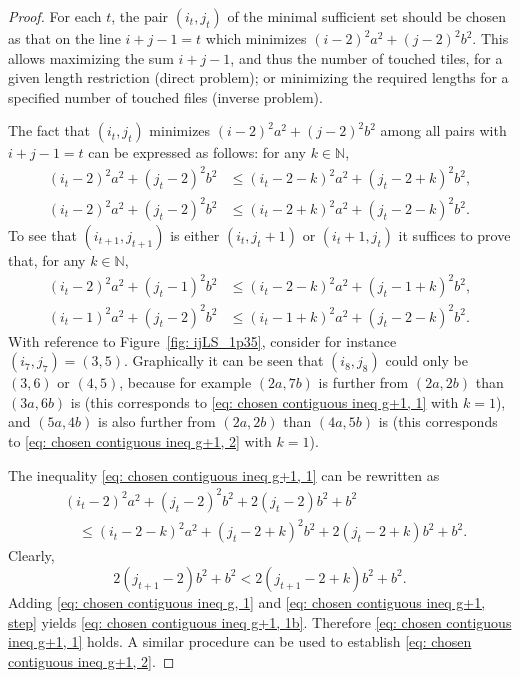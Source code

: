 \documentclass[12pt, a4paper]{article}
\newcommand{\tiles}{t} %
\begin{document}
\begin{proof}
For each $\tiles$, the pair $(i_\tiles,j_\tiles)$ of the minimal sufficient set should be chosen as that on the line $i+j-1=\tiles$ which minimizes $(i-2)^2 a^2 + (j-2)^2 b^2$. This allows maximizing the sum $i+j-1$, and thus the number of touched tiles, for a given length restriction (direct problem); or minimizing the required lengths for a specified number of touched files (inverse problem).

The fact that $(i_t,j_t)$ minimizes $(i-2)^2 a^2 + (j-2)^2 b^2$ among all pairs with $i+j-1=\tiles$ can be expressed as follows: for any $k \in \mathbb N$,
\begin{align}
\label{eq: chosen contiguous ineq g, 1}
(i_\tiles-2)^2 a^2 + (j_\tiles-2)^2 b^2 &\leq (i_\tiles-2-k)^2 a^2 + (j_\tiles-2+k)^2 b^2, \\
\label{eq: chosen contiguous ineq g, 2}
(i_\tiles-2)^2 a^2 + (j_\tiles-2)^2 b^2 &\leq (i_\tiles-2+k)^2 a^2 + (j_\tiles-2-k)^2 b^2.
\end{align}
To see that $(i_{\tiles+1},j_{\tiles+1})$ is either $(i_\tiles,j_\tiles+1)$ or $(i_\tiles+1,j_\tiles)$ it suffices to prove that, for any $k \in \mathbb N$,
\begin{align}
\label{eq: chosen contiguous ineq g+1, 1}
(i_{\tiles}-2)^2 a^2 + (j_{\tiles}-1)^2 b^2 &\leq (i_{\tiles}-2-k)^2 a^2 + (j_{\tiles}-1+k)^2 b^2, \\
\label{eq: chosen contiguous ineq g+1, 2}
(i_{\tiles}-1)^2 a^2 + (j_{\tiles}-2)^2 b^2 &\leq (i_{\tiles}-1+k)^2 a^2 + (j_{\tiles}-2-k)^2 b^2.
\end{align}
With reference to Figure~\ref{fig: ijLS_1p35}, consider for instance $(i_7,j_7) = (3,5)$. Graphically it can be seen that $(i_8,j_8)$ could only be $(3,6)$ or $(4,5)$, because for example $(2a,7b)$ is further from $(2a,2b)$ than $(3a,6b)$ is (this corresponds to \eqref{eq: chosen contiguous ineq g+1, 1} with $k=1$), and $(5a,4b)$ is also further from $(2a,2b)$ than $(4a,5b)$ is (this corresponds to \eqref{eq: chosen contiguous ineq g+1, 2} with $k=1$).

The inequality \eqref{eq: chosen contiguous ineq g+1, 1} can be rewritten as
\begin{equation}
\label{eq: chosen contiguous ineq g+1, 1b}
\begin{split}
& (i_{\tiles}-2)^2 a^2 + (j_{\tiles}-2)^2 b^2 + 2(j_{\tiles}-2)b^2 + b^2 \\
& \quad \leq (i_{\tiles}-2-k)^2 a^2 + (j_{\tiles}-2+k)^2 b^2 + 2(j_{\tiles}-2+k) b^2 + b^2.
\end{split}
\end{equation}
Clearly,
\begin{equation}
\label{eq: chosen contiguous ineq g+1, step}
2(j_{\tiles+1}-2)b^2 + b^2 < 2(j_{\tiles+1}-2+k) b^2 + b^2.
\end{equation}
Adding \eqref{eq: chosen contiguous ineq g, 1} and \eqref{eq: chosen contiguous ineq g+1, step} yields \eqref{eq: chosen contiguous ineq g+1, 1b}. Therefore \eqref{eq: chosen contiguous ineq g+1, 1} holds. A similar procedure can be used to establish \eqref{eq: chosen contiguous ineq g+1, 2}.


\end{proof}
\end{document}
